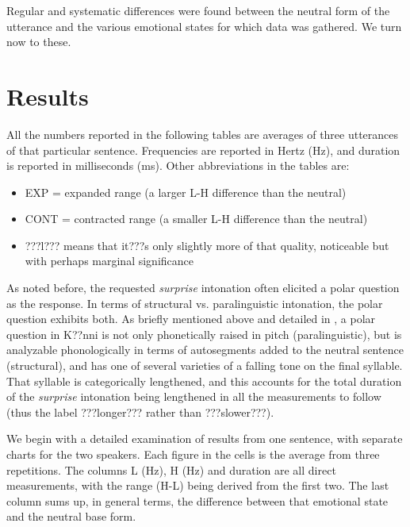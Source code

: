 \documentclass[output=paper]{langsci/langscibook}
\begin{document}
Regular and systematic differences were found between the neutral form of the utterance and the various emotional states for which data was gathered. We turn now to these. 

\section{Results }

All the numbers reported in the following tables are averages of three utterances of that particular sentence. Frequencies are reported in Hertz (Hz), and duration is reported in milliseconds (ms). Other abbreviations in the tables are: 


\begin{itemize}
\item EXP = expanded range (a larger L-H difference than the neutral)
\item CONT = contracted range (a smaller L-H difference than the neutral)
\item ???l??? means that it???s only slightly more of that quality, noticeable but with perhaps marginal significance 
\end{itemize}

As noted before, the requested \emph{surprise} intonation often elicited a polar question as the response. In terms of structural vs. paralinguistic intonation, the polar question exhibits both. As briefly mentioned above and detailed in \citet{Cahill2012}, a polar question in K??nni is not only phonetically raised in pitch (paralinguistic), but is analyzable phonologically in terms of autosegments added to the neutral sentence (structural), and has one of several varieties of a falling tone on the final syllable. That syllable is categorically lengthened, and this accounts for the total duration of the \emph{surprise} intonation being lengthened in all the measurements to follow (thus the label ???longer??? rather than ???slower???).


We begin with a detailed examination of results from one sentence, with separate charts for the two speakers. Each figure in the cells is the average from three repetitions. The columns L (Hz), H (Hz) and duration are all direct measurements, with the range (H-L) being derived from the first two. The last column sums up, in general terms, the difference between that emotional state and the neutral base form. 
\end{document}
